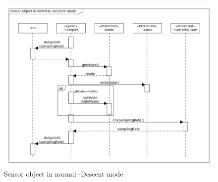 \begin{figure}[H]
    \centering
    \includegraphics[height=0.9\textwidth, angle=270]{appendix/img/sensor-dia-seq-c.png}
    \caption{Sensor object in normal -Descent mode}
    \label{sensorc}
\end{figure}